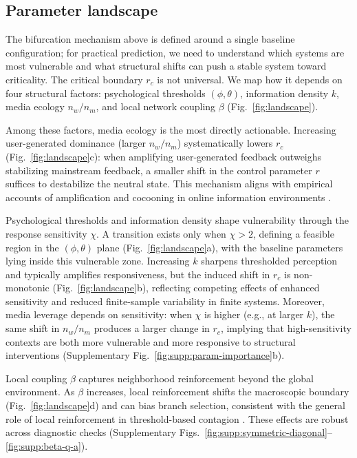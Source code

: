 \documentclass[11pt]{article}
\begin{document}
\subsection{Parameter landscape}
\label{sec:parameter-landscape}
The bifurcation mechanism above is defined around a single baseline configuration; for practical prediction, we need to understand which systems are most vulnerable and what structural shifts can push a stable system toward criticality. The critical boundary $r_c$ is not universal. We map how it depends on four structural factors: psychological thresholds $(\phi,\theta)$, information density $k$, media ecology $n_w/n_m$, and local network coupling $\beta$ (Fig.~\ref{fig:landscape}).

Among these factors, media ecology is the most directly actionable. Increasing user-generated dominance (larger $n_w/n_m$) systematically lowers $r_c$ (Fig.~\ref{fig:landscape}c): when amplifying user-generated feedback outweighs stabilizing mainstream feedback, a smaller shift in the control parameter $r$ suffices to destabilize the neutral state. This mechanism aligns with empirical accounts of amplification and cocooning in online information environments \citep{DelVicario2016SciRep,Piao2023}.

Psychological thresholds and information density shape vulnerability through the response sensitivity $\chi$. A transition exists only when $\chi>2$, defining a feasible region in the $(\phi,\theta)$ plane (Fig.~\ref{fig:landscape}a), with the baseline parameters lying inside this vulnerable zone. Increasing $k$ sharpens thresholded perception and typically amplifies responsiveness, but the induced shift in $r_c$ is non-monotonic (Fig.~\ref{fig:landscape}b), reflecting competing effects of enhanced sensitivity and reduced finite-sample variability in finite systems.
Moreover, media leverage depends on sensitivity: when $\chi$ is higher (e.g., at larger $k$), the same shift in $n_w/n_m$ produces a larger change in $r_c$, implying that high-sensitivity contexts are both more vulnerable and more responsive to structural interventions (Supplementary Fig.~\ref{fig:supp:param-importance}b).

Local coupling $\beta$ captures neighborhood reinforcement beyond the global environment. As $\beta$ increases, local reinforcement shifts the macroscopic boundary (Fig.~\ref{fig:landscape}d) and can bias branch selection, consistent with the general role of local reinforcement in threshold-based contagion \citep{Granovetter1978,Centola2010,Iacopini2019}. These effects are robust across diagnostic checks (Supplementary Figs.~\ref{fig:supp:symmetric-diagonal}--\ref{fig:supp:beta-q-a}).
\end{document}
